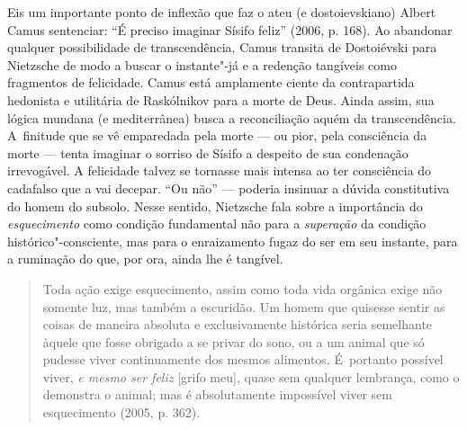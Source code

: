 Eis um importante ponto de inflexão que faz o ateu (e dostoievskiano)
Albert Camus sentenciar: ``É preciso imaginar Sísifo feliz'' (2006,
p. 168). Ao abandonar qualquer possibilidade de transcendência, Camus
transita de Dostoiévski para Nietzsche de modo a buscar o instante"-já e
a redenção tangíveis como fragmentos de felicidade. Camus está
amplamente ciente da contrapartida hedonista e utilitária de Raskólnikov
para a morte de Deus. Ainda assim, sua lógica mundana (e mediterrânea)
busca a reconciliação aquém da transcendência. A~finitude que se vê
emparedada pela morte --- ou pior, pela consciência da morte --- tenta
imaginar o sorriso de Sísifo a despeito de sua condenação irrevogável. A
felicidade talvez se tornasse mais intensa ao ter consciência do
cadafalso que a vai decepar. ``Ou não'' --- poderia insinuar a dúvida
constitutiva do homem do subsolo. Nesse sentido, Nietzsche fala sobre a
importância do \emph{esquecimento} como condição fundamental não para a
\emph{superação} da condição histórico"-consciente, mas para o
enraizamento fugaz do ser em seu instante, para a ruminação do que, por
ora, ainda lhe é tangível.

\begin{quote}
Toda ação exige esquecimento, assim como toda vida orgânica exige não
somente luz, mas também a escuridão. Um homem que quisesse sentir as
coisas de maneira absoluta e exclusivamente histórica seria semelhante
àquele que fosse obrigado a se privar do sono, ou a um animal que só
pudesse viver continuamente dos mesmos alimentos. É~portanto possível
viver, \emph{e mesmo ser feliz} {[}grifo meu{]}, quase sem qualquer
lembrança, como o demonstra o animal; mas é absolutamente impossível
viver sem esquecimento (2005, p. 362).
\end{quote}

